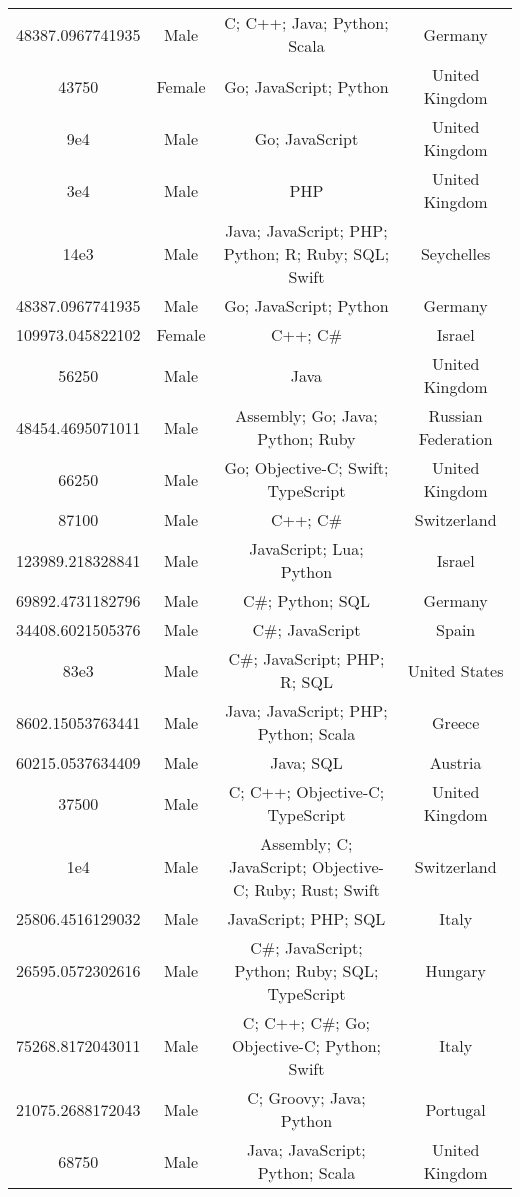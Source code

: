 \begin{center}
\begin{tabular}{ |c|c|c|c| }
48387.0967741935  &  Male  &  C; C++; Java; Python; Scala  &  Germany  \\ 
43750  &  Female  &  Go; JavaScript; Python  &  United Kingdom  \\ 
9e4  &  Male  &  Go; JavaScript  &  United Kingdom  \\ 
3e4  &  Male  &  PHP  &  United Kingdom  \\ 
14e3  &  Male  &  Java; JavaScript; PHP; Python; R; Ruby; SQL; Swift  &  Seychelles  \\ 
48387.0967741935  &  Male  &  Go; JavaScript; Python  &  Germany  \\ 
109973.045822102  &  Female  &  C++; C\#  &  Israel  \\ 
56250  &  Male  &  Java  &  United Kingdom  \\ 
48454.4695071011  &  Male  &  Assembly; Go; Java; Python; Ruby  &  Russian Federation  \\ 
66250  &  Male  &  Go; Objective-C; Swift; TypeScript  &  United Kingdom  \\ 
87100  &  Male  &  C++; C\#  &  Switzerland  \\ 
123989.218328841  &  Male  &  JavaScript; Lua; Python  &  Israel  \\ 
69892.4731182796  &  Male  &  C\#; Python; SQL  &  Germany  \\ 
34408.6021505376  &  Male  &  C\#; JavaScript  &  Spain  \\ 
83e3  &  Male  &  C\#; JavaScript; PHP; R; SQL  &  United States  \\ 
8602.15053763441  &  Male  &  Java; JavaScript; PHP; Python; Scala  &  Greece  \\ 
60215.0537634409  &  Male  &  Java; SQL  &  Austria  \\ 
37500  &  Male  &  C; C++; Objective-C; TypeScript  &  United Kingdom  \\ 
1e4  &  Male  &  Assembly; C; JavaScript; Objective-C; Ruby; Rust; Swift  &  Switzerland  \\ 
25806.4516129032  &  Male  &  JavaScript; PHP; SQL  &  Italy  \\ 
26595.0572302616  &  Male  &  C\#; JavaScript; Python; Ruby; SQL; TypeScript  &  Hungary  \\ 
75268.8172043011  &  Male  &  C; C++; C\#; Go; Objective-C; Python; Swift  &  Italy  \\ 
21075.2688172043  &  Male  &  C; Groovy; Java; Python  &  Portugal  \\ 
68750  &  Male  &  Java; JavaScript; Python; Scala  &  United Kingdom  \\ 

\end{tabular}
\end{center}
